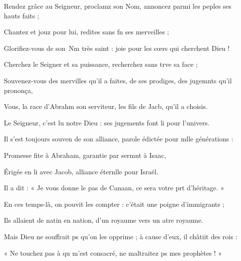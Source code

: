 \item Rendez grâce au Seigneur, proclamz son Nom,\psstar{} annoncez parmi les peples ses hauts faits ;
\item Chantez et jouz pour lui,\psstar{} redites sans fn ses merveilles ;
\item Glorifiez-vous de son Nm très saint :\psstar{} joie pour les cœrs qui cherchent Dieu !
\item Cherchez le Seigner et sa puissance,\psstar{} recherchez sans trve sa face ;
\item Souvenez-vous des mervilles qu’il a faites,\psstar{} de ses prodiges, des jugemnts qu’il prononça,
\item Vous, la race d’Abrahm son serviteur,\psstar{} les fils de Jacb, qu’il a choisis.
\item Le Seigneur, c’est lu notre Dieu :\psstar{} ses jugements font li pour l’univers.
\item Il s’est toujours souven de son alliance,\psstar{} parole édictée pour mlle générations :
\item Promesse fite à Abraham,\psstar{} garantie par sermnt à Isaac,
\item Érigée en li avec Jacob,\psstar{} alliance éternlle pour Israël.
\item Il a dit : « Je vous donne le pas de Canaan,\psstar{} ce sera votre prt d’héritage. »
\item En ces temps-là, on pouvit les compter :\psstar{} c’était une poigne d’immigrants ;
\item Ils allaient de natin en nation,\psstar{} d’un royaume vers un atre royaume.
\item Mais Dieu ne souffrait ps qu’on les opprime ;\psstar{} à cause d’eux, il châtiit des rois :
\item « Ne touchez pas à qu m’est consacré,\psstar{} ne maltraitez ps mes prophètes ! »